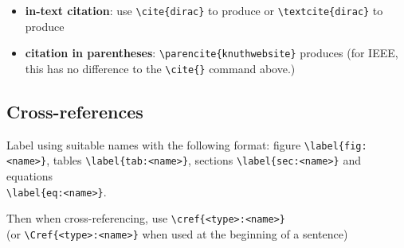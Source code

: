\documentclass[../main.tex]{subfiles}
\begin{document}
\begin{itemize} 
    \item \textbf{in-text citation}: use
        \verb|\cite{dirac}| to produce \cite{dirac} or
        \verb|\textcite{dirac}| to produce \textcite{dirac}
    \item \textbf{citation in parentheses}:
        \verb|\parencite{knuthwebsite}| produces 
        \parencite{knuthwebsite} (for IEEE, this has no 
        difference to the \verb|\cite{}| command
        above.)
\end{itemize}

\subsection{Cross-references}

Label using suitable names with the following format: figure 
\verb|\label{fig:<name>}|, tables \verb|\label{tab:<name>}|,
sections \verb|\label{sec:<name>}| and equations\\ 
\verb|\label{eq:<name>}|.

Then when cross-referencing, use
\verb|\cref{<type>:<name>}|\\
(or \verb|\Cref{<type>:<name>}| when used at the beginning 
of a sentence)
\end{document}
